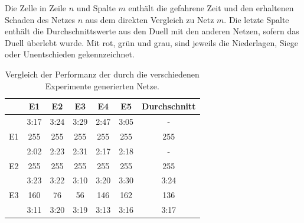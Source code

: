\documentclass[11pt,final,journal,a4paper,towside,towcolumn]{IEEEtran}
\begin{document}
\begin{table}
	\setlength{}
	\caption{Vergleich der Performanz der durch die verschiedenen Experimente generierten Netze.}{Die Zelle in Zeile $n$ und Spalte $m$ enthält die gefahrene Zeit und den erhaltenen Schaden des Netzes $n$ aus dem direkten Vergleich zu Netz $m$. Die letzte Spalte enthält die Durchschnittswerte aus den Duell mit den anderen Netzen, sofern das Duell überlebt wurde. Mit rot, grün und grau, sind jeweils die Niederlagen, Siege oder Unentschieden gekennzeichnet.}
	\label{tab:turnier}
	\centering
	\begin{tabular}{|c|c|c|c|c|c|c|}
		\hline
		& E1                                                   & E2                            & E3                            & E4                            & E5                            & Durchschnitt \\ \hline
		& \cellcolor[HTML]{C0C0C0} 3:17 & \cellcolor[HTML]{C0C0C0}3:24 & \cellcolor[HTML]{FFCCC9}3:29 & \cellcolor[HTML]{FFCCC9}2:47 & \cellcolor[HTML]{FFCCC9}3:05 & \cellcolor[HTML]{C0C0C0}-       \\ \cline{2-7} 
		\multirow{-2}{*}{E1} & \cellcolor[HTML]{C0C0C0}255 & \cellcolor[HTML]{C0C0C0}255  & \cellcolor[HTML]{FFCCC9}255  & \cellcolor[HTML]{FFCCC9}255  & \cellcolor[HTML]{FFCCC9}255  & \cellcolor[HTML]{C0C0C0}255     \\ \hline
		& \cellcolor[HTML]{C0C0C0}2:02                        & \cellcolor[HTML]{C0C0C0}2:23 & \cellcolor[HTML]{FFCCC9}2:31 & \cellcolor[HTML]{FFCCC9}2:17 & \cellcolor[HTML]{FFCCC9}2:18 & \cellcolor[HTML]{C0C0C0}-       \\ \cline{2-7} 
		\multirow{-2}{*}{E2} & \cellcolor[HTML]{C0C0C0}255                         & \cellcolor[HTML]{C0C0C0}255  & \cellcolor[HTML]{FFCCC9}255  & \cellcolor[HTML]{FFCCC9}255  & \cellcolor[HTML]{FFCCC9}255  & \cellcolor[HTML]{C0C0C0}255     \\ \hline
		& \cellcolor[HTML]{9AFF99}3:23                        & \cellcolor[HTML]{9AFF99}3:22 & \cellcolor[HTML]{C0C0C0}3:10 & \cellcolor[HTML]{FFCCC9}3:20 & \cellcolor[HTML]{FFCCC9}3:30 & \cellcolor[HTML]{C0C0C0}3:24    \\ \cline{2-7} 
		\multirow{-2}{*}{E3} & \cellcolor[HTML]{9AFF99}160                         & \cellcolor[HTML]{9AFF99}76   & \cellcolor[HTML]{C0C0C0}56   & \cellcolor[HTML]{FFCCC9}146  & \cellcolor[HTML]{FFCCC9}162  & \cellcolor[HTML]{C0C0C0}136     \\ \hline
		& \cellcolor[HTML]{9AFF99}3:11                        & \cellcolor[HTML]{9AFF99}3:20 & \cellcolor[HTML]{9AFF99}3:19 & \cellcolor[HTML]{C0C0C0}3:13 & \cellcolor[HTML]{9AFF99}3:16 & \cellcolor[HTML]{9AFF99}3:17    \\ \cline{2-7} 

\end{tabular}
\end{table}
\end{document}

